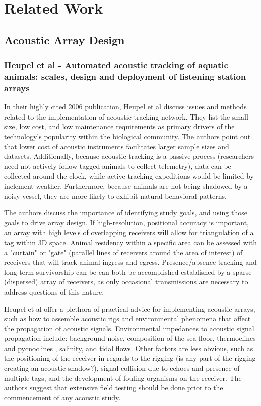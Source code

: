 \chapter{Related Work}

\section{Acoustic Array Design}
\subsection{Heupel et al - Automated acoustic tracking of aquatic animals: scales, design and deployment of listening station arrays}
In their highly cited 2006 publication\cite{Heupel2006}, Heupel et al discuss issues and methods related to the implementation of acoustic tracking network.  They list the small size, low cost, and low maintenance requirements as primary drivers of the technology's popularity within the biological community.  The authors point out that lower cost of acoustic instruments facilitates larger sample sizes and datasets.  Additionally, because acoustic tracking is a passive process (researchers need not actively follow tagged animals to collect telemetry), data can be collected around the clock, while active tracking expeditions would be limited by inclement weather.  Furthermore, because animals are not being shadowed by a noisy vessel, they are more likely to exhibit natural behavioral patterns.

The authors discuss the importance of identifying study goals, and using those goals to drive array design.  If high-resolution, positional accuracy is important, an array with high levels of overlapping receivers will allow for triangulation of a tag within 3D space.  Animal residency within a specific area can be assessed with a "curtain" or "gate" (parallel lines of receivers around the area of interest) of receivers that will track animal ingress and egress.  Presence/absence tracking and long-term survivorship can be can both be accomplished established by a sparse (dispersed) array of receivers, as only occasional transmissions are necessary to address questions of this nature.

Heupel et al offer a plethora of practical advice for implementing acoustic arrays, such as how to assemble acoustic rigs and environmental phenomena that affect the propagation of acoustic signals.  Environmental impedances to acoustic signal propagation include: background noise, composition of the sea floor, thermoclines and pycnoclines , salinity, and tidal flows.  Other factors are less obvious, such as the positioning of the receiver in regards to the rigging (is any part of the rigging creating an acoustic shadow?), signal collision due to echoes and presence of multiple tags, and the development of fouling organisms on the receiver.  The authors suggest that extensive field testing should be done prior to the commencement of any acoustic study.


